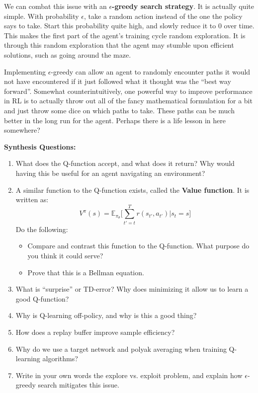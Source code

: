     We can combat this issue with an \textbf{$\epsilon$-greedy search strategy}. It is actually quite simple. With probability $\epsilon$, take a random action instead of the one the policy says to take. Start this probability quite high, and slowly reduce it to 0 over time. This makes the first part of the agent's training cycle random exploration. It is through this random exploration that the agent may stumble upon efficient solutions, such as going around the maze. 
    
    Implementing $\epsilon$-greedy can allow an agent to randomly encounter paths it would not have encountered if it just followed what it thought was the ``best way forward''. Somewhat counterintuitively, one powerful way to improve performance in RL is to actually throw out all of the fancy mathematical formulation for a bit and just throw some dice on which paths to take. These paths can be much better in the long run for the agent. Perhaps there is a life lesson in here somewhere?

\begin{questionbox}
\textbf{Synthesis Questions:}
\begin{enumerate}
    \item What does the Q-function accept, and what does it return? Why would having this be useful for an agent navigating an environment?
    \item A similar function to the Q-function exists, called the \textbf{Value function}. It is written as:
    $$V^\pi(s) = \mathbb{E}_{\pi_\theta} \biggl[ \sum_{t' = t}^T r(s_{t'}, a_{t'}) | s_t = s\biggr]$$
    Do the following:
    \begin{itemize}
        \item Compare and contrast this function to the Q-function. What purpose do you think it could serve?
        \item Prove that this is a Bellman equation.
    \end{itemize}
    \item What is ``surprise'' or TD-error? Why does minimizing it allow us to learn a good Q-function?
    \item Why is Q-learning off-policy, and why is this a good thing?
    \item How does a replay buffer improve sample efficiency?
    \item Why do we use a target network and polyak averaging when training Q-learning algorithms?
    \item Write in your own words the explore vs. exploit problem, and explain how $\epsilon$-greedy search mitigates this issue.
\end{enumerate}
\end{questionbox}

